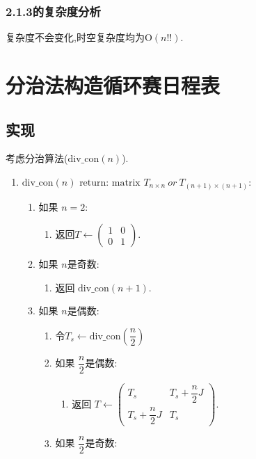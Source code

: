 \documentclass[UTF8]{ctexart}
\newcommand{\gro}{\mathrm{O}}
\begin{document}
\subsubsection{2.1.3的复杂度分析}
复杂度不会变化,时空复杂度均为$\gro(n!!)$.
\newpage
\section{分治法构造循环赛日程表}
\subsection{实现}
考虑分治算法($\mathrm{div\_con}(n)$).
\begin{enumerate}[]
    \item $\mathrm{div\_con}(n)\text{ return: matrix }T_{n\times n}\ or\ T_{(n+1)\times (n+1)}$:
    \begin{enumerate}[1]
        \item 如果 $n = 2$:
        \begin{enumerate}[1]
            \item 返回$T \leftarrow\begin{pmatrix}
                1 & 0\\
                0 & 1
            \end{pmatrix}$.
        \end{enumerate}
        \item 如果 $n$是奇数:
        \begin{enumerate}[1]
            \item 返回 $\mathrm{div\_con}(n + 1)$.
        \end{enumerate}
        \item 如果 $n$是偶数:
        \begin{enumerate}[1]
            \item 令$T_s \leftarrow \mathrm{div\_con}(\dfrac{n}{2})$
            \item 如果 $\dfrac{n}{2}$是偶数:
            \begin{enumerate}[1]
                \item 返回 $T  \leftarrow\begin{pmatrix}
                    T_s & T_s + \dfrac{n}{2}J\\
                    T_s + \dfrac{n}{2}J & T_s
                \end{pmatrix}$.
            \end{enumerate}
            \item 如果 $\dfrac{n}{2}$是奇数:
            \begin{enumerate}[1]

\end{enumerate}
\end{enumerate}
\end{enumerate}
\end{enumerate}
\end{document}
